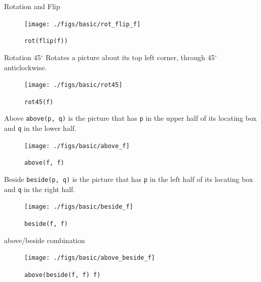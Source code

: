 \documentclass{beamer}
\begin{document}
    \begin{frame}{Rotation and Flip}

        \begin{figure}
            \centering
            \texttt{[image: ./figs/basic/rot\_flip\_f]}
            \caption{\texttt{rot(flip(f))}}
            \label{fig:rot_flip_f}
        \end{figure}
    \end{frame}

    \begin{frame}{Rotation 45$^{\circ}$}
    	Rotates a picture about its top left corner, through 45$^{\circ}$ anticlockwise.

        \begin{figure}
            \centering
            \texttt{[image: ./figs/basic/rot45]}
            \caption{\texttt{rot45(f)}}
            \label{fig:rot45}
        \end{figure}
    \end{frame}

    \begin{frame}{Above}
        \texttt{above(p, q)} is the picture that has \texttt{p} in the upper half
        of its locating box and \texttt{q} in the lower half.

        \begin{figure}
            \centering
            \texttt{[image: ./figs/basic/above\_f]}
            \caption{\texttt{above(f, f)}}
            \label{fig:above}
        \end{figure}
    \end{frame}

    \begin{frame}{Beside}
        \texttt{beside(p, q)} is the picture that has \texttt{p} in the left half
        of its locating box and \texttt{q} in the right half.

        \begin{figure}
            \centering
            \texttt{[image: ./figs/basic/beside\_f]}
            \caption{\texttt{beside(f, f)}}
            \label{fig:beside}
        \end{figure}
    \end{frame}

    \begin{frame}{above/beside combination}
        \begin{figure}
            \centering
            \texttt{[image: ./figs/basic/above\_beside\_f]}
            \caption{\texttt{above(beside(f, f) f)}}
            \label{fig:above_beside_f}
        \end{figure}
    \end{frame}
\end{document}
